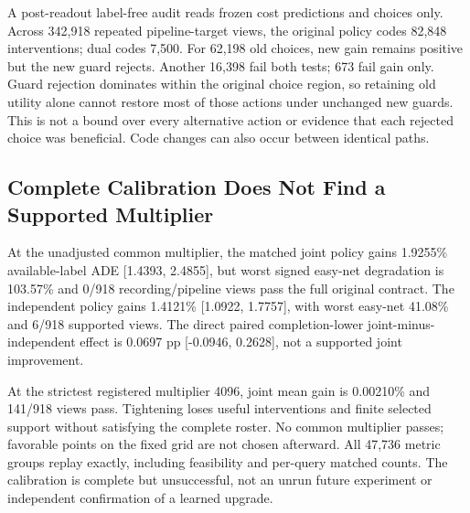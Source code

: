 \documentclass[10pt,twocolumn,letterpaper]{article}
\begin{document}
A post-readout label-free audit reads frozen cost predictions and choices only.
Across 342,918 repeated pipeline-target views, the original policy codes 82,848
interventions; dual codes 7,500. For 62,198 old choices, new gain remains positive
but the new guard rejects. Another 16,398 fail both tests; 673 fail gain only.
Guard rejection dominates within the original choice region, so retaining old
utility alone cannot restore most of those actions under unchanged new guards.
This is not a bound over every alternative action or evidence that each rejected
choice was beneficial. Code changes can also occur between identical paths.

\subsection{Complete Calibration Does Not Find a Supported Multiplier}
At the unadjusted common multiplier, the matched joint policy gains 1.9255\%
available-label ADE [1.4393, 2.4855], but worst signed easy-net degradation is
103.57\% and 0/918 recording/pipeline views pass the full original contract. The
independent policy gains 1.4121\% [1.0922, 1.7757], with worst easy-net 41.08\% and
6/918 supported views. The direct paired completion-lower joint-minus-independent
effect is 0.0697 pp [-0.0946, 0.2628], not a supported joint improvement.

At the strictest registered multiplier 4096, joint mean gain is 0.00210\% and
141/918 views pass. Tightening loses useful interventions and finite selected
support without satisfying the complete roster. No common multiplier passes;
favorable points on the fixed grid are not chosen afterward. All 47,736 metric
groups replay exactly, including feasibility and per-query matched counts.
The calibration is complete but unsuccessful, not an unrun future experiment
or independent confirmation of a learned upgrade.
\end{document}
